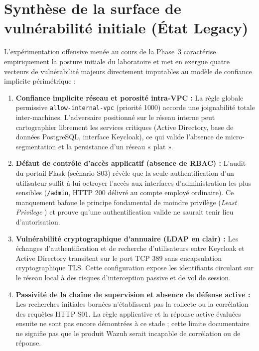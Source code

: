\documentclass[a4paper,12pt]{report}
\begin{document}
\section{Synthèse de la surface de vulnérabilité initiale (État Legacy)}
L'expérimentation offensive menée au cours de la Phase~3 caractérise empiriquement la posture initiale du laboratoire et met en exergue quatre vecteurs de vulnérabilité majeurs directement imputables au modèle de confiance implicite périmétrique :
\begin{enumerate}
    \item \textbf{Confiance implicite réseau et porosité intra-VPC :} La règle globale permissive \texttt{allow-internal-vpc} (priorité 1000) accorde une joignabilité totale inter-machines. L'adversaire positionné sur le réseau interne peut cartographier librement les services critiques (Active Directory, base de données PostgreSQL, interface Keycloak), ce qui valide l'absence de micro-segmentation et la persistance d'un réseau « plat ».
    \item \textbf{Défaut de contrôle d'accès applicatif (absence de RBAC) :} L'audit du portail Flask (scénario S03) révèle que la seule authentification d'un utilisateur suffit à lui octroyer l'accès aux interfaces d'administration les plus sensibles (\texttt{/admin}, HTTP 200 délivré au compte employé ordinaire). Ce manquement bafoue le principe fondamental de moindre privilège (\textit{Least Privilege} \cite{saltzer1975}) et prouve qu'une authentification valide ne saurait tenir lieu d'autorisation.
    \item \textbf{Vulnérabilité cryptographique d'annuaire (LDAP en clair) :} Les échanges d'authentification et de recherche d'utilisateurs entre Keycloak et Active Directory transitent sur le port TCP 389 sans encapsulation cryptographique TLS. Cette configuration expose les identifiants circulant sur le réseau local à des risques d'interception passive et de vol de session.
    \item \textbf{Passivité de la chaîne de supervision et absence de défense active :} Les recherches initiales bornées n'établissent pas la collecte ou la corrélation des requêtes HTTP S01. La règle applicative et la réponse active évaluées ensuite ne sont pas encore démontrées à ce stade ; cette limite documentaire ne signifie pas que le produit Wazuh serait incapable de corrélation ou de réponse.
\end{enumerate}
\end{document}
